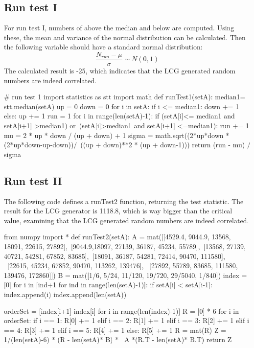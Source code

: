 \subsection*{Run test I}
For run test I, numbers of above the median and below are computed. Using these, the mean and variance of the normal distribution can be calculated. Then the following variable should have a standard normal distribution:
\begin{equation}
    \frac{N_{run} - \mu} {\sigma} \sim N(0,1)
\end{equation}
The calculated result is -25, which indicates that the LCG generated random numbers are indeed correlated.
\begin{python}
# run test 1
import statistics as stt
import math
def runTest1(setA):
    median1= stt.median(setA)
    up = 0
    down = 0
    for i in setA:
        if i <= median1:
            down += 1
        else:
            up += 1
    run = 1
    for i in range(len(setA)-1):
        if (setA[i]<= median1 and setA[i+1] >median1) or\
        (setA[i]>median1 and setA[i+1] <=median1):
            run += 1
    mu = 2 * up * down / (up + down) + 1
    sigma = math.sqrt((2*up*down * (2*up*down-up-down))/\
                      ((up + down)**2 * (up + down-1)))
    return (run - mu) / sigma
\end{python}
\subsection*{Run test II}
The following code defines a runTest2 function, returning the test statistic. The result for the LCG generator is 1118.8, which is way bigger than the critical value, examining that the LCG generated random numbers are indeed correlated.
\begin{python}
from numpy import *
def runTest2(setA):
    A = mat([[4529.4, 9044.9, 13568, 18091, 22615, 27892],\
             [9044.9,18097, 27139, 36187, 45234, 55789],\
             [13568, 27139, 40721, 54281, 67852, 83685],\
             [18091, 36187, 54281, 72414, 90470, 111580], \
             [22615, 45234, 67852, 90470, 113262, 139476], \
             [27892, 55789, 83685, 111580, 139476, 172860]])
    B = mat([1/6, 5/24, 11/120, 19/720, 29/5040, 1/840])
    index = [0]
    for i in [ind+1 for ind in range(len(setA)-1)]:
        if setA[i] < setA[i-1]:
            index.append(i)
    index.append(len(setA))  
    
    orderSet = [index[i+1]-index[i] for i in range(len(index)-1)]
    R = [0] * 6
    for i in orderSet:
        if i == 1:
            R[0] += 1
        elif i == 2:
            R[1] += 1
        elif i == 3:
            R[2] += 1
        elif i == 4:
            R[3] += 1
        elif i == 5:
            R[4] += 1
        else:
            R[5] += 1
    R = mat(R)
    Z = 1/(len(setA)-6) * (R - len(setA)* B) * \
    A *(R.T - len(setA)* B.T)
    return Z
\end{python}
